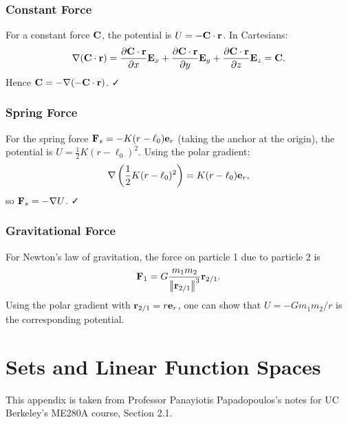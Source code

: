 \documentclass[
  letterpaper,
  DIV=11,
  numbers=noendperiod]{scrreprt}
\newcommand{\lnorm}{\left|\!\left|}
\newcommand{\rnorm}{\right|\!\right|}
\newcommand{\lp}{\left(}
\newcommand{\rp}{\right)}
\begin{document}
\subsection{Constant Force}\label{constant-force}

For a constant force \({\bf C}\), the potential is
\(U = -{\bf C}\cdot{\bf r}\). In Cartesians: \begin{align}
    \nabla({\bf C}\cdot{\bf r}) = \frac{\partial{\bf C}\cdot{\bf r}}{\partial x}{\bf E}_x+\frac{\partial{\bf C}\cdot{\bf r}}{\partial y}{\bf E}_y+\frac{\partial{\bf C}\cdot{\bf r}}{\partial z}{\bf E}_z = {\bf C}.
\end{align} Hence \({\bf C} = -\nabla(-{\bf C}\cdot{\bf r})\). ✓

\subsection{Spring Force}\label{spring-force-2}

For the spring force \({\bf F}_s = -K(r-\ell_0){\bf e}_r\) (taking the
anchor at the origin), the potential is
\(U = \frac{1}{2}K(r-\ell_0)^2\). Using the polar gradient:
\begin{align}
    \nabla\lp\frac{1}{2}K(r-\ell_0)^2\rp = K(r-\ell_0){\bf e}_r,
\end{align} so \({\bf F}_s = -\nabla U\). ✓

\subsection{Gravitational Force}\label{gravitational-force-2}

For Newton's law of gravitation, the force on particle 1 due to particle
2 is \begin{align}
    {\bf F}_1 = G\frac{m_1 m_2}{\lnorm{\bf r}_{2/1}\rnorm^3}{\bf r}_{2/1}.
\end{align} Using the polar gradient with
\({\bf r}_{2/1} = r{\bf e}_r\), one can show that \(U = -Gm_1m_2/r\) is
the corresponding potential.

\chapter{Sets and Linear Function
Spaces}\label{sets-and-linear-function-spaces}

\begin{tcolorbox}[enhanced jigsaw, arc=.35mm, bottomrule=.15mm, bottomtitle=1mm, breakable, colback=white, colbacktitle=quarto-callout-note-color!10!white, colframe=quarto-callout-note-color-frame, coltitle=black, left=2mm, leftrule=.75mm, opacityback=0, opacitybacktitle=0.6, rightrule=.15mm, title=\textcolor{quarto-callout-note-color}{\faInfo}\hspace{0.5em}{Note}, titlerule=0mm, toprule=.15mm, toptitle=1mm]

This appendix is taken from Professor Panayiotis Papadopoulos's notes
for UC Berkeley's ME280A course, Section 2.1.

\end{tcolorbox}
\end{document}

